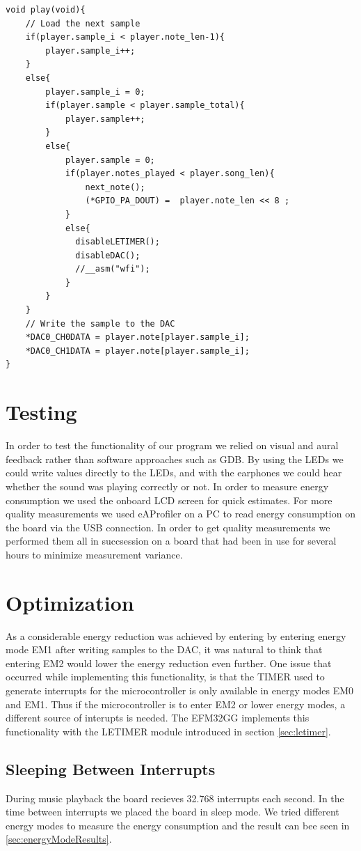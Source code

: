 \begin{minipage}{\textwidth}
\begin{lstlisting}
void play(void){
	// Load the next sample
	if(player.sample_i < player.note_len-1){			
		player.sample_i++;								
	}
	else{								
		player.sample_i = 0;
		if(player.sample < player.sample_total){
   			player.sample++;				
		}
		else{							
			player.sample = 0;
			if(player.notes_played < player.song_len){
				next_note();
				(*GPIO_PA_DOUT) =  player.note_len << 8 ;		
			}			 
			else{
			  disableLETIMER();
			  disableDAC();
			  //__asm("wfi");
			}
		}
	}
	// Write the sample to the DAC
	*DAC0_CH0DATA = player.note[player.sample_i];
	*DAC0_CH1DATA = player.note[player.sample_i];
}
\end{lstlisting}
\end{minipage}



\section{Testing}
In order to test the functionality of our program we relied on visual and aural feedback rather than software approaches such as GDB. By using the LEDs we could write values directly to the LEDs, and with the earphones we could hear whether the sound was playing correctly or not. In order to measure energy consumption we used the onboard LCD screen for quick estimates. For more quality measurements we used eAProfiler on a PC to read energy consumption on the board via the USB connection. In order to get quality measurements we performed them all in succsession on a board that had been in use for several hours to minimize measurement variance. 

\section{Optimization}

As a considerable energy reduction was achieved by entering by entering energy mode EM1 after writing samples to the DAC, it was natural to think that entering EM2 would lower the energy reduction even further. One issue that occurred while implementing this functionality, is that the TIMER used to generate interrupts for the microcontroller is only available in energy modes EM0 and EM1. Thus if the microcontroller is to enter EM2 or lower energy modes, a different source of interupts is needed. The EFM32GG implements this functionality with the LETIMER module introduced in section \ref{sec:letimer}.

\subsection{Sleeping Between Interrupts}
During music playback the board recieves 32.768 interrupts each second. In the time between interrupts we placed the board in sleep mode. We tried different energy modes to measure the energy consumption and the result can bee seen in \ref{sec:energyModeResults}.
